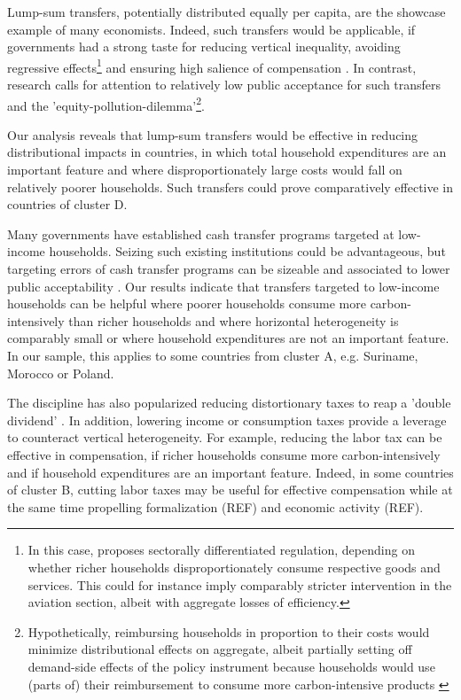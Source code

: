 \documentclass[12pt, a4paper]{article}
\begin{document}
Lump-sum transfers, potentially distributed equally per capita, are the showcase example of many economists. Indeed, such transfers would be applicable, if governments had a strong taste for reducing vertical inequality, avoiding regressive effects\footnote{In this case, \textcite{Stiglitz.2019} proposes sectorally differentiated regulation, depending on whether richer households disproportionately consume respective goods and services. This could for instance imply comparably stricter intervention in the aviation section, albeit with aggregate losses of efficiency.} and ensuring high salience of compensation \autocite{Chetty.2009}. In contrast, research calls for attention to relatively low public acceptance for such transfers and the 'equity-pollution-dilemma'\footnote{Hypothetically, reimbursing households in proportion to their costs would minimize distributional effects on aggregate, albeit partially setting off demand-side effects of the policy instrument because households would use (parts of) their reimbursement to consume more carbon-intensive products \autocite{Stiglitz.2019}}\autocite{Sager.2019}.

Our analysis reveals that lump-sum transfers would be effective in reducing distributional impacts in countries, in which total household expenditures are an important feature and where disproportionately large costs would fall on relatively poorer households. Such transfers could prove comparatively effective in countries of cluster D. %

Many governments have established cash transfer programs targeted at low-income households. Seizing such existing institutions could be advantageous, but targeting errors of cash transfer programs can be sizeable \autocite{Banerjee.2022} and associated to lower public acceptability \autocite{Bah.2019}. Our results indicate that transfers targeted to low-income households can be helpful where poorer households consume more carbon-intensively than richer households and where horizontal heterogeneity is comparably small or where household expenditures are not an important feature. In our sample, this applies to some countries from cluster A, e.g. Suriname, Morocco or Poland.

The discipline has also popularized reducing distortionary taxes to reap a 'double dividend' \autocite{Bovenberg.1996}. In addition, lowering income or consumption taxes provide a leverage to counteract vertical heterogeneity. For example, reducing the labor tax can be effective in compensation, if richer households consume more carbon-intensively and if household expenditures are an important feature. Indeed, in some countries of cluster B, cutting labor taxes may be useful for effective compensation while at the same time propelling formalization (REF) and economic activity (REF).
\end{document}
